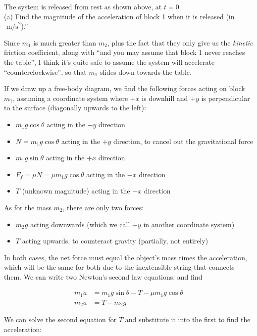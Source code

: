 \documentclass[8.01x]{subfiles}
\begin{document}
The system is released from rest as shown above, at $t = 0$.\\
(a) Find the magnitude of the acceleration of block 1 when it is released (in $\text{ m/s}^2$).''

Since $m_1$ is much greater than $m_2$, plus the fact that they only give us the \emph{kinetic} friction coefficient, along with ``and you may assume that block 1 never reaches the table'', I think it's quite safe to assume the system will accelerate ``counterclockwise'', so that $m_1$ slides down towards the table.

If we draw up a free-body diagram, we find the following forces acting on block $m_1$, assuming a coordinate system where $+x$ is downhill and $+y$ is perpendicular to the surface (diagonally upwards to the left):

\begin{itemize}
\item $m_1 g \cos \theta$ acting in the $-y$ direction
\item $N = m_1 g \cos \theta$ acting in the $+y$ direction, to cancel out the gravitational force
\item $m_1 g \sin \theta$ acting in the $+x$ direction
\item $F_f = \mu N = \mu m_1 g \cos \theta$ acting in the $-x$ direction
\item $T$ (unknown magnitude) acting in the $-x$ direction
\end{itemize}

As for the mass $m_2$, there are only two forces:

\begin{itemize}
\item $m_2 g$ acting downwards (which we call $-y$ in another coordinate system)
\item $T$ acting upwards, to counteract gravity (partially, not entirely)
\end{itemize}

In both cases, the net force must equal the object's mass times the acceleration, which will be the same for both due to the inextensible string that connects them. We can write two Newton's second law equations, and find

\begin{align}
m_1 a &= m_1 g \sin \theta - T - \mu m_1 g \cos \theta\\
m_2 a &= T - m_2 g
\end{align}

We can solve the second equation for $T$ and substitute it into the first to find the acceleration:
\end{document}
